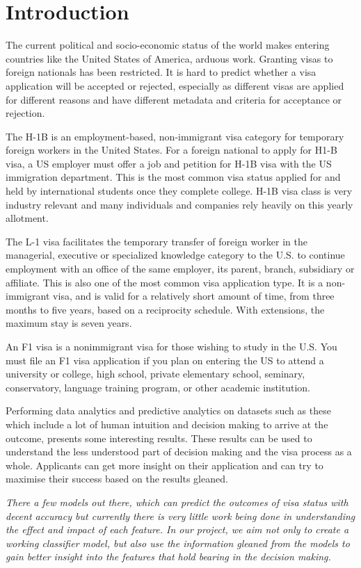 \documentclass[conference]{IEEEtran}
\begin{document}
\section{Introduction}
The current political and socio-economic status of the world makes entering countries like the United States of America, arduous work. Granting visas to foreign nationals has been restricted. It is hard to predict whether a visa application will be accepted or rejected, especially as different visas are applied for different reasons and have different metadata and criteria for acceptance or rejection.

The H-1B is an employment-based, non-immigrant
visa category for temporary foreign workers in the
United States. For a foreign national to apply for H1-B
visa, a US employer must offer a job and petition for
H-1B visa with the US immigration department. This
is the most common visa status applied for and held
by international students once they complete college. H-1B visa class is very industry relevant
and many individuals and companies rely heavily on
this yearly allotment.

The L-1 visa facilitates the temporary transfer of foreign worker in the managerial, executive or specialized knowledge category to the U.S. to continue employment with an office of the same employer, its parent, branch, subsidiary or affiliate. This is also one of the most common visa application type.  It is a non-immigrant visa, and is valid for a relatively short amount of time, from three months to five years, based on a reciprocity schedule. With extensions, the maximum stay is seven years.

An F1 visa is a nonimmigrant visa for those wishing to study in the U.S. You must file an F1 visa application if you plan on entering the US to attend a university or college, high school, private elementary school, seminary, conservatory, language training program, or other academic institution.

Performing data analytics and predictive analytics on datasets such as these which include a lot of human intuition and decision making to arrive at the outcome, presents some interesting results. These results can be used to understand the less understood part of decision making and the visa process as a whole. Applicants can get more insight on their application and can try to maximise their success based on the results gleaned.

\textit{
There a few models out there, which can predict the outcomes of visa status with decent accuracy but currently there is very little work being done in understanding the effect and impact of each feature. In our project, we aim not only to create a working classifier model, but also use the information gleaned from the models to gain better insight into the features that hold bearing in the decision making.}
\end{document}
